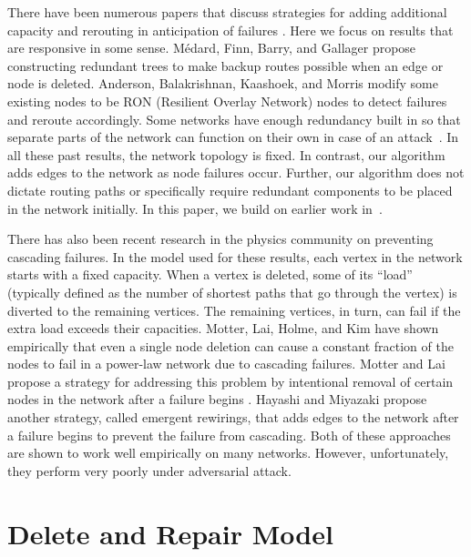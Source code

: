 \documentclass[11pt]{article}
\begin{document}
\medskip
{} There have been numerous papers that
discuss strategies for adding additional capacity and rerouting in
anticipation of failures \cite{ doverspike94capacity,
frisanco97capacity, iraschko98capacity, murakami97comparative,
caenegem97capacity, xiong99restore}.  Here we focus on results that
are responsive in some sense.  M\'{e}dard, Finn, Barry, and Gallager
\cite{medard99redundant} propose constructing redundant trees to make
backup routes possible when an edge or node is deleted.  Anderson,
Balakrishnan, Kaashoek, and Morris \cite{anderson01RON} modify some
existing nodes to be RON (Resilient Overlay Network) nodes to detect
failures and reroute accordingly. Some networks have enough redundancy
built in so that separate parts of the network can function on their
own in case of an attack~\cite{goel04resilient}.  In all these past
results, the network topology is fixed.  In contrast, our algorithm
adds edges to the network as node failures occur.  Further, our
algorithm does not dictate routing paths or specifically require
redundant components to be placed in the network initially.  In this
paper, we build on earlier work in~\cite{BomanSAS06, SaiaTrehanIPDPS08}.



There has also been recent research in the physics community on
preventing cascading failures.  In the model used for these results,
each vertex in the network starts with a fixed capacity. When a vertex
is deleted, some of its ``load'' (typically defined as the number of
shortest paths that go through the vertex) is diverted to the
remaining vertices.  The remaining vertices, in turn, can fail if the
extra load exceeds their capacities. Motter, Lai, Holme, and Kim have
shown empirically that even a single node deletion can cause a
constant fraction of the nodes to fail in a power-law network due to
cascading failures\cite{holme-2002-65, motter-2002-66}. Motter and Lai
propose a strategy for addressing this problem by intentional removal
of certain nodes in the network after a failure begins
\cite{motter-2004-93}.  Hayashi and Miyazaki propose another strategy,
called emergent rewirings, that adds edges to the network after a
failure begins to prevent the failure from
cascading\cite{hayashi2005}.  Both of these approaches are
shown to work well empirically on many networks.  However, unfortunately, they
perform very poorly under adversarial attack.


\section{Delete and Repair Model}
\label{sec:prelim}
\end{document}
